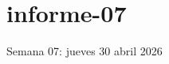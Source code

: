 \documentclass[./informes.tex]{subfiles}
\begin{document}
\chapter{informe-07}

Semana 07: jueves 30 abril 2026







\printbibliography[
  heading=subbibliography
]
\end{document}

